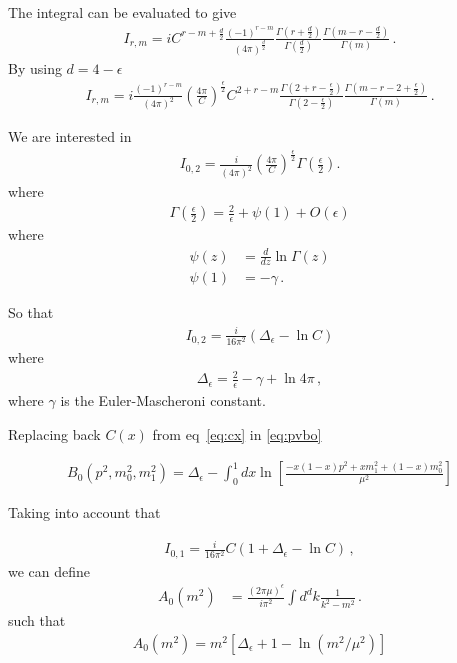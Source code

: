 The integral can be evaluated to give
\begin{align}
  I_{r, m}=i C^{r-m+\frac{d}{2}} \frac{(-1)^{r-m}}{(4 \pi)^{\frac{d}{2}}} \frac{\Gamma\left(r+\frac{d}{2}\right)}{\Gamma\left(\frac{d}{2}\right)} \frac{\Gamma\left(m-r-\frac{d}{2}\right)}{\Gamma(m)}\,.
\end{align}
By using $d=4-\epsilon$
\begin{align}
  I_{r, m}=i \frac{(-1)^{r-m}}{(4 \pi)^{2}}\left(\frac{4 \pi}{C}\right)^{\frac{\epsilon}{2}} C^{2+r-m} \frac{\Gamma\left(2+r-\frac{\epsilon}{2}\right)}{\Gamma\left(2-\frac{\epsilon}{2}\right)} \frac{\Gamma\left(m-r-2+\frac{\epsilon}{2}\right)}{\Gamma(m)}\,.
\end{align}

We are interested in
\begin{align}
  I_{0,2}=\frac{i}{(4 \pi)^{2}}\left(\frac{4 \pi}{C}\right)^{\frac{\epsilon}{2}} \Gamma\left(\frac{\epsilon}{2}\right).
\end{align}
where
\begin{align}
  \Gamma\left(\frac{\epsilon}{2}\right)=\frac{2}{\epsilon}+\psi(1)+O(\epsilon)
\end{align}
where
\begin{align}
\psi(z) &=\frac{d}{d z} \ln \Gamma(z) \\ \psi(1) &=-\gamma \,.
\end{align}

So that
\begin{align}
  I_{0,2}=\frac{i}{16 \pi^{2}}\left(\Delta_{\epsilon}-\ln C\right)
\end{align}
where
\begin{align}
  \Delta_{\epsilon}=\frac{2}{\epsilon}-\gamma+\ln 4 \pi\,,
\end{align}
where $\gamma$ is the Euler-Mascheroni constant.


Replacing back $C(x)$ from eq~\eqref{eq:cx} in \eqref{eq:pvbo}

\begin{align}
  \label{eq:gpvbo}
  B_{0}\left(p^{2}, m_{0}^{2}, m_{1}^{2}\right)=\Delta_{\epsilon}-\int_{0}^{1} d x \ln \left[\frac{-x(1-x) p^{2}+x m_{1}^{2}+(1-x) m_{0}^{2}}{\mu^{2}}\right]
\end{align}

Taking into account that

\begin{align}
  \label{eq:I01}
  I_{0,1}=\frac{i}{16 \pi^{2}} C\left(1+\Delta_{\epsilon}-\ln C\right)\,,
\end{align}
we can define
\begin{align}
   A_{0}\left(m^{2}\right) &=\frac{(2 \pi \mu)^{\epsilon}}{i \pi^{2}} \int d^{d} k \frac{1}{k^{2}-m^{2}}\,.
\end{align}
such that
\begin{align*}
  A_0\left(m^2\right)=m^2 \left[ \Delta_{\epsilon}+1-\ln \left( m^2/\mu^2 \right) \right]
\end{align*}

